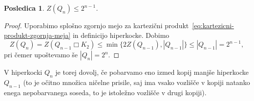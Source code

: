 \documentclass[12pt,a4paper,twoside]{article}
\theoremstyle{definition} %
\theoremstyle{plain} %
\newtheorem{posledica}[definicija]{Posledica}
\numberwithin{equation}{section}  %
\DeclareMathOperator{\boxempty}{\Box}
\begin{document}
\begin{posledica}
    $Z(Q_n) \leq 2^{n-1}$.
\end{posledica}
\begin{proof}
    Uporabimo splošno zgornjo mejo za kartezični produkt~\eqref{eq:kartezicni-produkt-zgornja-meja} in definicijo hiperkocke. Dobimo
    \[
        Z(Q_n) = Z(Q_{n-1} \boxempty K_2) \leq \min \{ 2Z(Q_{n-1}), |Q_{n-1}| \} \leq |Q_{n-1}| = 2^{n-1},
    \]
    pri čemer upoštevamo še $|Q_{n}| = 2^n$.
\end{proof}
V hiperkocki $Q_n$ je torej dovolj, če pobarvamo eno izmed kopij manjše hiperkocke $Q_{n-1}$ (to je očitno množica ničelne prisile, saj ima vsako vozlišče v kopiji natanko enega nepobarvanega soseda, to je istoležno vozlišče v drugi kopiji).

\end{document}
